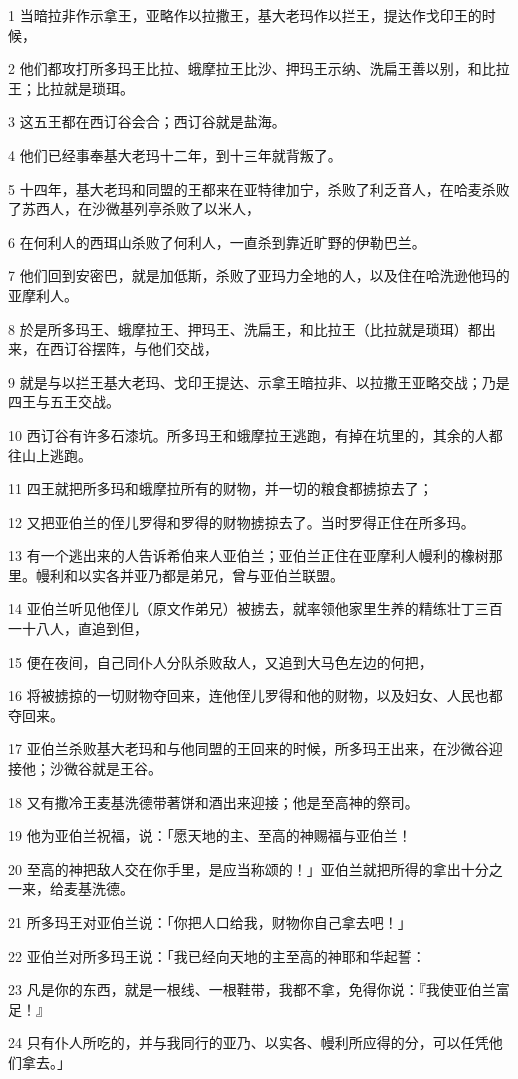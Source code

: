 \par 1 当暗拉非作示拿王，亚略作以拉撒王，基大老玛作以拦王，提达作戈印王的时候，
\par 2 他们都攻打所多玛王比拉、蛾摩拉王比沙、押玛王示纳、洗扁王善以别，和比拉王；比拉就是琐珥。
\par 3 这五王都在西订谷会合；西订谷就是盐海。
\par 4 他们已经事奉基大老玛十二年，到十三年就背叛了。
\par 5 十四年，基大老玛和同盟的王都来在亚特律加宁，杀败了利乏音人，在哈麦杀败了苏西人，在沙微基列亭杀败了以米人，
\par 6 在何利人的西珥山杀败了何利人，一直杀到靠近旷野的伊勒巴兰。
\par 7 他们回到安密巴，就是加低斯，杀败了亚玛力全地的人，以及住在哈洗逊他玛的亚摩利人。
\par 8 於是所多玛王、蛾摩拉王、押玛王、洗扁王，和比拉王（比拉就是琐珥）都出来，在西订谷摆阵，与他们交战，
\par 9 就是与以拦王基大老玛、戈印王提达、示拿王暗拉非、以拉撒王亚略交战；乃是四王与五王交战。
\par 10 西订谷有许多石漆坑。所多玛王和蛾摩拉王逃跑，有掉在坑里的，其余的人都往山上逃跑。
\par 11 四王就把所多玛和蛾摩拉所有的财物，并一切的粮食都掳掠去了；
\par 12 又把亚伯兰的侄儿罗得和罗得的财物掳掠去了。当时罗得正住在所多玛。
\par 13 有一个逃出来的人告诉希伯来人亚伯兰；亚伯兰正住在亚摩利人幔利的橡树那里。幔利和以实各并亚乃都是弟兄，曾与亚伯兰联盟。
\par 14 亚伯兰听见他侄儿（原文作弟兄）被掳去，就率领他家里生养的精练壮丁三百一十八人，直追到但，
\par 15 便在夜间，自己同仆人分队杀败敌人，又追到大马色左边的何把，
\par 16 将被掳掠的一切财物夺回来，连他侄儿罗得和他的财物，以及妇女、人民也都夺回来。
\par 17 亚伯兰杀败基大老玛和与他同盟的王回来的时候，所多玛王出来，在沙微谷迎接他；沙微谷就是王谷。
\par 18 又有撒冷王麦基洗德带著饼和酒出来迎接；他是至高神的祭司。
\par 19 他为亚伯兰祝福，说：「愿天地的主、至高的神赐福与亚伯兰！
\par 20 至高的神把敌人交在你手里，是应当称颂的！」亚伯兰就把所得的拿出十分之一来，给麦基洗德。
\par 21 所多玛王对亚伯兰说：「你把人口给我，财物你自己拿去吧！」
\par 22 亚伯兰对所多玛王说：「我已经向天地的主至高的神耶和华起誓：
\par 23 凡是你的东西，就是一根线、一根鞋带，我都不拿，免得你说：『我使亚伯兰富足！』
\par 24 只有仆人所吃的，并与我同行的亚乃、以实各、幔利所应得的分，可以任凭他们拿去。」

